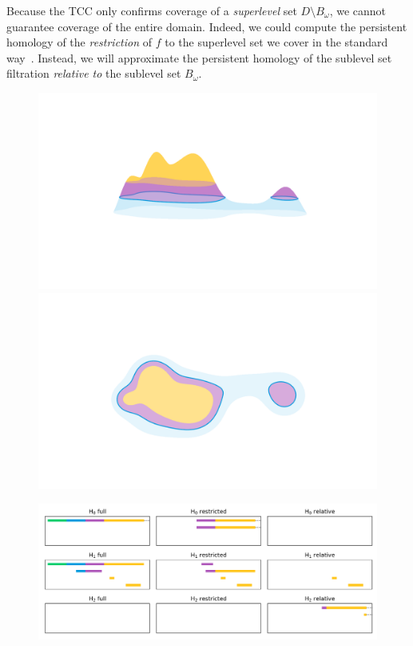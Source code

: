 
Because the TCC only confirms coverage of a \emph{superlevel} set $D\setminus B_\omega$, we cannot guarantee coverage of the entire domain.
Indeed, we could compute the persistent homology of the \emph{restriction} of $f$ to the superlevel set we cover in the standard way~\cite{chazal09analysis}.
Instead, we will approximate the persistent homology of the sublevel set filtration \emph{relative to} the sublevel set $B_\omega$.

\begin{figure}[htbp]
  \centering
  \begin{minipage}[b]{0.27\textwidth}
    \includegraphics[trim=200 200 200 100, clip, width=\textwidth]{scripts/figures/surf/ass2_C_side.png}\\
    \includegraphics[trim=200 100 200 200, clip, width=\textwidth]{scripts/figures/surf/ass2_C_top.png}
  \end{minipage}
  \begin{minipage}[b]{0.7\textwidth}
    \includegraphics[width=\textwidth]{scripts/figures/barcodes/res_rel.png}

\end{minipage}
\end{figure}
